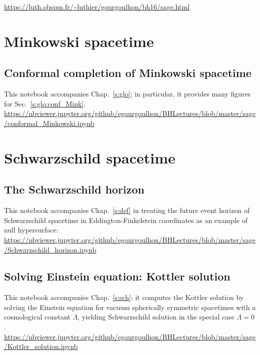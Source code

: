 \centerline{
\url{https://luth.obspm.fr/~luthier/gourgoulhon/bh16/sage.html}}

\section{Minkowski spacetime}

\subsection{Conformal completion of Minkowski spacetime} \label{s:sam:conformal_Mink}

This notebook accompanies Chap.~\ref{s:glo}; in particular, it provides
many figures for Sec.~\ref{s:glo:conf_Mink}.\\[1ex]
{\footnotesize
\url{https://nbviewer.jupyter.org/github/egourgoulhon/BHLectures/blob/master/sage/conformal_Minkowski.ipynb}
}


\section{Schwarzschild spacetime}

\subsection{The Schwarzschild horizon} \label{s:sam:Schwarz_hor}

This notebook accompanies Chap.~\ref{s:def} in treating the future event horizon of
Schwarzschild spacetime in Eddington-Finkelstein coordinates as an example of null hypersurface:\\[1ex]
{\footnotesize
\url{https://nbviewer.jupyter.org/github/egourgoulhon/BHLectures/blob/master/sage/Schwarzschild_horizon.ipynb}
}


\subsection{Solving Einstein equation: Kottler solution} \label{s:sam:Kottler_solution}

This notebook accompanies Chap.~\ref{s:sch}: it computes the Kottler solution by solving the Einstein
equation for vacuum spherically symmetric spacetimes with a cosmological constant $\Lambda$,
yielding Schwarzschild solution in the special case $\Lambda=0$. \\[1ex]
{\footnotesize
\url{https://nbviewer.jupyter.org/github/egourgoulhon/BHLectures/blob/master/sage/Kottler_solution.ipynb}
}


